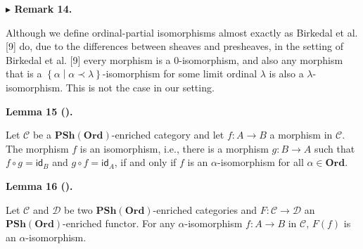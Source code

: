 
 
\par\medskip\noindent\textbf{$\blacktriangleright$ Remark 14.}\par
 
 
Although we define ordinal-partial isomorphisms almost exactly as Birkedal et al. [9] do, due to the differences between sheaves and presheaves, in the setting of Birkedal et al. [9] every morphism is a 0-isomorphism, and also any morphism that is a $\left\{\alpha\middle|\alpha\prec\lambda\right\}$-isomorphism for some limit ordinal $\lambda$ is also a $\lambda$-isomorphism. This is not the case in our setting.\par
 
 
 
 
\par\medskip\noindent\textbf{Lemma 15 ().}\par
 
 
Let $\mathcal{C}$ be a $\mathbf{PSh}(\mathbf{Ord})$-enriched category and let $f:A\to B$ a morphism in $\mathcal{C}$. The morphism $f$ is an isomorphism, i.e., there is a morphism $g:B\to A$ such that $f\circ g=\mathsf{id}_{B}$ and $g\circ f=\mathsf{id}_{A}$, if and only if $f$ is an $\alpha$-isomorphism for all $\alpha\in\mathbf{Ord}$.\par
 
 
 
 
\par\medskip\noindent\textbf{Lemma 16 ().}\par
 
 
Let $\mathcal{C}$ and $\mathcal{D}$ be two $\mathbf{PSh}(\mathbf{Ord})$-enriched categories and $F:\mathcal{C}\to\mathcal{D}$ an $\mathbf{PSh}(\mathbf{Ord})$-enriched functor. For any $\alpha$-isomorphism $f:A\to B$ in $\mathcal{C}$, $F(f)$ is an $\alpha$-isomorphism.\par
 
 
 
